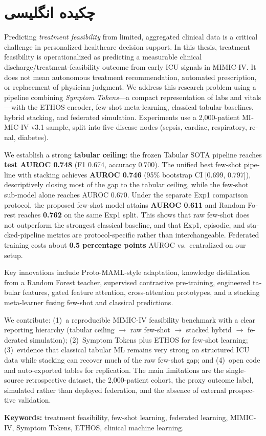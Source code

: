 \chapter*{چکیده انگلیسی}
\begin{latin}
\small
\noindent
Predicting \emph{treatment feasibility} from limited, aggregated clinical data is a critical challenge in personalized healthcare decision support. In this thesis, treatment feasibility is operationalized as predicting a measurable clinical discharge/treatment-feasibility outcome from early ICU signals in MIMIC-IV. It does not mean autonomous treatment recommendation, automated prescription, or replacement of physician judgment. We address this research problem using a pipeline combining \emph{Symptom Tokens}---a compact representation of labs and vitals---with the ETHOS encoder, few-shot meta-learning, classical tabular baselines, hybrid stacking, and federated simulation. Experiments use a 2{,}000-patient MIMIC-IV v3.1 sample, split into five disease nodes (sepsis, cardiac, respiratory, renal, diabetes).

We establish a strong \textbf{tabular ceiling}: the frozen Tabular SOTA pipeline reaches \textbf{test AUROC 0.748} (F1 0.674, accuracy 0.700). The unified best few-shot pipeline with stacking achieves \textbf{AUROC 0.746} (95\% bootstrap CI [0.699, 0.797]), descriptively closing most of the gap to the tabular ceiling, while the few-shot sub-model alone reaches AUROC 0.670. Under the separate Exp1 comparison protocol, the proposed few-shot model attains \textbf{AUROC 0.611} and Random Forest reaches \textbf{0.762} on the same Exp1 split. This shows that raw few-shot does not outperform the strongest classical baseline, and that Exp1, episodic, and stacked-pipeline metrics are protocol-specific rather than interchangeable. Federated training costs about \textbf{0.5 percentage points} AUROC vs.\ centralized on our setup.

Key innovations include Proto-MAML-style adaptation, knowledge distillation from a Random Forest teacher, supervised contrastive pre-training, engineered tabular features, gated feature attention, cross-attention prototypes, and a stacking meta-learner fusing few-shot and classical predictions.

We contribute: (1)~a reproducible MIMIC-IV feasibility benchmark with a clear reporting hierarchy (tabular ceiling $\rightarrow$ raw few-shot $\rightarrow$ stacked hybrid $\rightarrow$ federated simulation); (2)~Symptom Tokens plus ETHOS for few-shot learning; (3)~evidence that classical tabular ML remains very strong on structured ICU data while stacking can recover much of the raw few-shot gap; and (4)~open code and auto-exported tables for replication. The main limitations are the single-source retrospective dataset, the 2{,}000-patient cohort, the proxy outcome label, simulated rather than deployed federation, and the absence of external prospective validation.

\vspace{1em}
\noindent\textbf{Keywords:} treatment feasibility, few-shot learning, federated learning, MIMIC-IV, Symptom Tokens, ETHOS, clinical machine learning.
\end{latin}
\cleardoublepage
